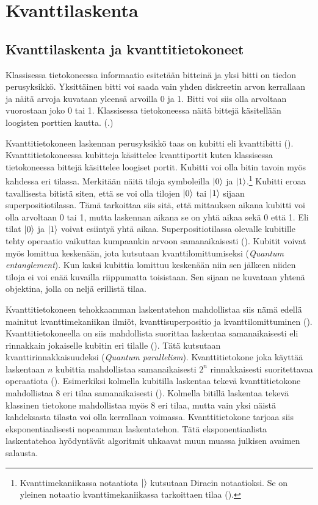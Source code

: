 \chapter{Kvanttilaskenta}

\section{Kvanttilaskenta ja kvanttitietokoneet}
Klassisessa tietokoneessa informaatio esitetään bitteinä ja yksi bitti on tiedon perusyksikkö. Yksittäinen bitti voi saada vain yhden diskreetin arvon kerrallaan ja näitä arvoja kuvataan yleensä arvoilla 0 ja 1. Bitti voi siis olla arvoltaan vuorostaan joko 0 tai 1. Klassisessa tietokoneessa näitä bittejä käsitellään loogisten porttien kautta. (\cite{doi:10.1080/23742917.2016.1226650}.)

Kvanttitietokoneen laskennan perusyksikkö taas on kubitti eli kvanttibitti (\cite{doi:10.1080/23742917.2016.1226650}). Kvanttitietokoneessa kubitteja käsittelee kvanttiportit kuten klassisessa tietokoneessa bittejä käsittelee loogiset portit. Kubitti voi olla bitin tavoin myös kahdessa eri tilassa. Merkitään näitä tiloja symboleilla
$\ket{0}$ ja $\ket{1}$.\footnote{Kvanttimekaniikassa notaatiota $\ket{}$ kutsutaan Diracin notaatioksi. Se on yleinen notaatio kvanttimekaniikassa tarkoittaen tilaa (\cite{nielsen2001quantum}).} Kubitti eroaa tavallisesta bitistä siten, että se voi olla tilojen $\ket{0}$ tai $\ket{1}$ sijaan superpositiotilassa. Tämä tarkoittaa siis sitä, että mittauksen aikana kubitti voi olla arvoltaan 0 tai 1, mutta laskennan aikana se on yhtä aikaa sekä 0 että 1. Eli tilat $\ket{0}$ ja $\ket{1}$ voivat esiintyä yhtä aikaa. Superpositiotilassa olevalle kubitille tehty operaatio vaikuttaa kumpaankin arvoon samanaikaisesti (\cite{mavroeidis2018impact}). Kubitit voivat myös lomittua keskenään, jota kutsutaan kvanttilomittumiseksi (\emph{Quantum entanglement}). Kun kaksi kubittia lomittuu keskenään niin sen jälkeen niiden tiloja ei voi enää kuvailla riippumatta toisistaan. Sen sijaan ne kuvataan yhtenä objektina, jolla on neljä erillistä tilaa.

Kvanttitietokoneen tehokkaamman laskentatehon mahdollistaa siis nämä edellä mainitut kvanttimekaniikan ilmiöt, kvanttisuperpositio ja kvanttilomittuminen (\cite{mavroeidis2018impact}). Kvanttitietokoneella on siis mahdollista suorittaa laskentaa samanaikaisesti eli rinnakkain jokaiselle kubitin eri tilalle (\cite{doi:10.1080/23742917.2016.1226650}). Tätä kutsutaan kvanttirinnakkaisuudeksi (\emph{Quantum parallelism}). Kvanttitietokone joka käyttää laskentaan $n$ kubittia mahdollistaa samanaikaisesti $2^{n}$ rinnakkaisesti suoritettavaa operaatiota (\cite{mavroeidis2018impact}). Esimerkiksi kolmella kubitilla laskentaa tekevä kvanttitietokone mahdollistaa 8 eri tilaa samanaikaisesti (\cite{doi:10.1080/23742917.2016.1226650}). Kolmella bitillä laskentaa tekevä klassinen tietokone mahdollistaa myös 8 eri tilaa, mutta vain yksi näistä kahdeksasta tilasta voi olla kerrallaan voimassa.  Kvanttitietokone tarjoaa siis eksponentiaalisesti nopeamman laskentatehon. Tätä eksponentiaalista laskentatehoa hyödyntävät algoritmit uhkaavat muun muassa julkisen avaimen salausta.

